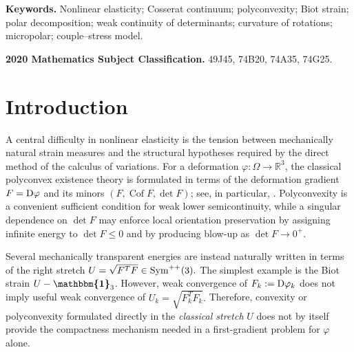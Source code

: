 \documentclass[11pt]{article}
\newcommand{\id}{{\boldsymbol{\mathbbm{1}}}}
\begin{document}
\noindent\textbf{Keywords.} Nonlinear elasticity; Cosserat continuum; polyconvexity; Biot strain; polar decomposition; weak continuity of determinants; curvature of rotations; micropolar; couple--stress model.

\medskip

\noindent\textbf{2020 Mathematics Subject Classification.} 49J45, 74B20, 74A35, 74G25.

\begin{footnotesize}
\tableofcontents
\end{footnotesize}

\section{Introduction}


A central difficulty in nonlinear elasticity is the tension between mechanically natural strain measures and the structural hypotheses required by the direct method of the calculus of variations. For a deformation $\varphi:\Omega\to\mathbb R^3$, the classical polyconvex existence theory is formulated in terms of the deformation gradient $F={\rm D}\varphi$ and its minors $(F,\operatorname{Cof}F,\det F)$; see, in particular, \cite{Ball1976,Ball1977}. Polyconvexity is a convenient sufficient condition for weak lower semicontinuity, while a singular dependence on $\det F$ may enforce local orientation preservation by assigning infinite energy to $\det F\leq0$ and by producing blow-up as $\det F\to0^+$.

Several mechanically transparent energies are instead naturally written in terms of the right stretch
$
U=\sqrt{F^TF}\in {\rm Sym}^{++}(3).
$
The simplest example is the Biot strain $U-\id_3$. However, weak convergence of $F_k:={\rm D}\varphi_k$ does not imply useful weak convergence of
$
U_{k}=\sqrt{F_k^TF_k}.
$
Therefore, convexity or polyconvexity formulated directly in the {\it classical stretch} $U$ does not by itself provide the compactness mechanism needed in a first-gradient problem for $\varphi$ alone.
\end{document}
